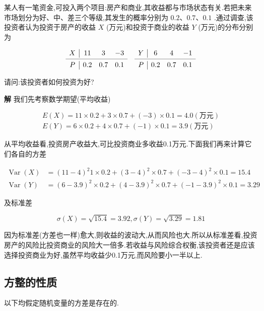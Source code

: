 \begin{example}\label{exam:2.3.2}
	某人有一笔资金,可投入两个项目:房产和商业,其收益都与市场状态有关.若把未来市场划分为好、中、差三个等级,其发生的概率分别为 $ 0.2、0.7、0.1 $ .通过调查,该投资者认为投资于房产的收益 $ X $ (万元)和投资于商业的收益 $ Y $ (万元)的分布分别为
	
	\[
	\begin{array}{c|ccccc|ccc}
	X     & 11    & 3     & -3    &       & Y     & 6     & 4     & -1 \\
	\cmidrule{1-4}\cmidrule{6-9}    P     & 0.2   & 0.7   & 0.1   &       & P     & 0.2   & 0.7   & 0.1 \\
	\end{array}
	\]
	
	请问:该投资者如何投资为好?
	
	\textbf{解} 我们先考察数学期望(平均收益)
	
	\[
	\begin{array}{c}
	{E(X)=11 \times 0.2+3 \times 0.7+(-3) \times 0.1=4.0 (\text{万元})} \\ 
	{E(Y)=6 \times 0.2+4 \times 0.7+(-1) \times 0.1=3.9(\text{万元})}
	\end{array}
	\]
	
	从平均收益看,投资房产收益大,可比投资商业多收益0.1万元.下面我们再来计算它们各自的方差
	
	\[
	\begin{aligned} 
	\operatorname{Var}(X) & =(11-4)^{2} 1 \times 0.2+(3-4)^{2} \times 0.7+(-3-4)^{2} \times 0.1=15.4 \\ 
	\operatorname{Var}(Y) & =(6-3.9)^{2} \times 0.2+(4-3.9)^{2} \times 0.7+(-1-3.9)^{2} \times 0.1=3.29 
	\end{aligned}
	\]
	
	及标准差
	
	\[
	\sigma(X)=\sqrt{15.4}=3.92, \sigma(Y)=\sqrt{3.29}=1.81
	\]
	
	因为标准差(方差也一样)愈大,则收益的波动大,从而风险也大.所以从标准差看,投资房产的风险比投资商业的风险大一倍多.若收益与风险综合权衡,该投资者还是应该选择投资商业为好,虽然平均收益少0.1万元,而风险要小一半以上.
	
\end{example}

\subsection{方整的性质}

以下均假定随机变量的方差是存在的.

